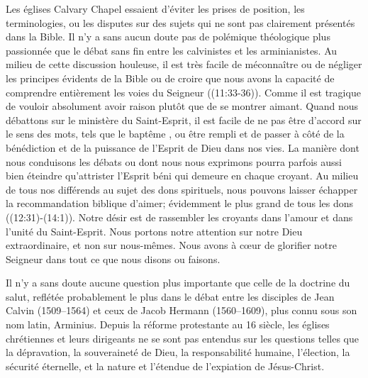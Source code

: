 Les églises Calvary Chapel essaient \pocketlinebreak
 d'éviter les prises de position, les terminologies,
 ou les disputes
 sur des sujets qui ne sont pas clairement présentés dans la Bible.
 Il n'y a sans aucun doute pas de polémique théologique plus passionnée que le débat sans fin
 entre les calvinistes et les arminianistes. Au milieu de cette discussion houleuse,
 il est très facile de méconnaître ou de négliger les principes évidents de la Bible
 ou de croire que nous avons la capacité de comprendre entièrement les voies du Seigneur
 ((11:33-36)).
 Comme il est tragique de vouloir absolument avoir raison plutôt que de se montrer aimant.
 Quand nous débattons sur le ministère du Saint-Esprit, il est facile de ne pas être d'accord
 sur le sens des mots, tels que le \og baptême \fg{}, ou \og être rempli \fg{} 
 et de passer à côté de la bénédiction et de la puissance de l'Esprit de Dieu dans nos vies.
 La manière dont nous conduisons les débats ou dont nous nous exprimons pourra parfois
 aussi bien \og éteindre \fg{}  qu'\og attrister\fg{} 
 l'Esprit béni qui demeure en chaque croyant.
 Au milieu de tous nos différends au sujet des dons spirituels,
 nous pouvons laisser échapper la recommandation biblique d'aimer;
 évidemment le plus grand de tous les dons ((12:31)-(14:1)).
 Notre désir est de rassembler les croyants dans l'amour et dans l'unité du Saint-Esprit.
 Nous portons notre attention sur notre Dieu extraordinaire, et non sur
 nous-mêmes.
 Nous avons à cœur de glorifier notre Seigneur dans tout ce que nous disons ou faisons.

Il n'y a sans doute aucune question plus importante que celle de la doctrine du salut,
 reflétée probablement le plus dans le débat entre les disciples de Jean Calvin (1509--1564)
 et ceux de Jacob Hermann \pocketlinebreak (1560--1609), plus connu sous son nom latin, Arminius.
 Depuis la réforme protestante au 16 siècle, les églises chrétiennes
 et leurs dirigeants ne se sont pas entendus sur les questions telles que la dépravation,
 la souveraineté de Dieu, la responsabilité humaine, l'élection, la sécurité éternelle,
 et la nature et l'étendue de l'expiation de Jésus-Christ.

